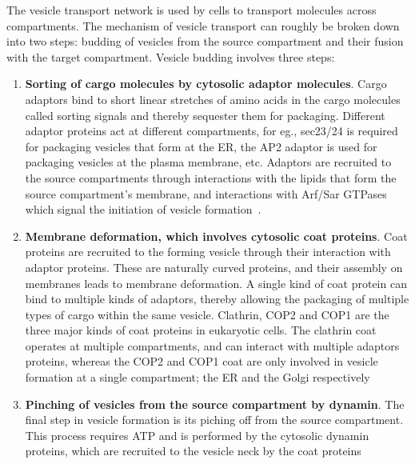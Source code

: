 The vesicle transport network is used by cells to transport molecules across compartments.
% 
The mechanism of vesicle transport can roughly be broken down into two steps: budding of vesicles from the source compartment and their fusion with the target compartment.
%
Vesicle budding involves three steps:
\begin{enumerate}
	\item  \textbf{Sorting of cargo molecules by cytosolic adaptor molecules}. 
	 Cargo adaptors bind to short linear stretches of amino acids in the cargo molecules called sorting signals and thereby sequester them for packaging. 
	 Different adaptor proteins act at different compartments, for eg., sec23/24 is required
	for packaging vesicles that form at the ER, the AP2 adaptor is used for packaging vesicles at the plasma membrane, etc. 
	Adaptors are recruited to the source compartments through interactions with
	the lipids that form the source compartment's membrane, and interactions with Arf/Sar GTPases which signal the initiation of vesicle formation~\cite{paczkowski2015cargo}.
	
	\item \textbf{Membrane deformation, which involves cytosolic coat proteins}.
	   Coat proteins are recruited to the forming vesicle through their interaction with adaptor proteins. 
	   These are naturally curved proteins, and their assembly on membranes leads to membrane deformation.
	   A single kind of coat protein can bind to multiple kinds of adaptors, thereby allowing the packaging of multiple types of cargo within the same vesicle. 
	   Clathrin, COP2 and COP1 are the three major kinds of coat proteins
	   in eukaryotic cells. 
	   The clathrin coat operates at multiple compartments, and can interact with
	   multiple adaptors proteins, whereas the COP2 and COP1 coat are only involved in vesicle formation at a single compartment; the ER and the Golgi respectively~\cite{faini2013vesicle}
	   
	   
	 \item \textbf{Pinching of vesicles from the source compartment by dynamin}.
	 The final step in vesicle formation is its piching off from the source compartment.
	 This process requires ATP and is performed by the cytosolic dynamin proteins, which are recruited to the vesicle neck by the coat proteins~\cite{cocucci2014dynamin}
\end{enumerate}


